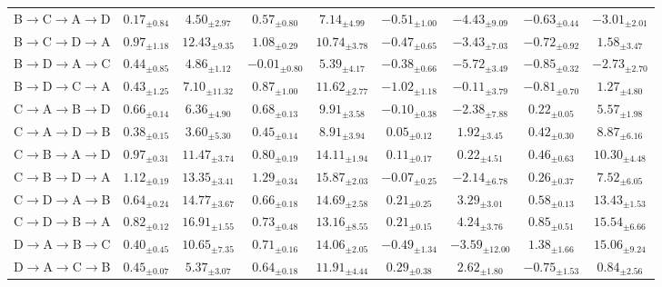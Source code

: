 \begin{table}[!t]
\begin{tabular*}{\textwidth}{@{\extracolsep{\fill}}lcccccccc}
B$\to$C$\to$A$\to$D & $0.17_{\pm0.84}$ & $4.50_{\pm2.97}$ & $0.57_{\pm0.80}$ & $7.14_{\pm4.99}$ & $-0.51_{\pm1.00}$ & $-4.43_{\pm9.09}$ & $-0.63_{\pm0.44}$ & $-3.01_{\pm2.01}$ \\
B$\to$C$\to$D$\to$A & $0.97_{\pm1.18}$ & $12.43_{\pm9.35}$ & $1.08_{\pm0.29}$ & $10.74_{\pm3.78}$ & $-0.47_{\pm0.65}$ & $-3.43_{\pm7.03}$ & $-0.72_{\pm0.92}$ & $1.58_{\pm3.47}$ \\
B$\to$D$\to$A$\to$C & $0.44_{\pm0.85}$ & $4.86_{\pm1.12}$ & $-0.01_{\pm0.80}$ & $5.39_{\pm4.17}$ & $-0.38_{\pm0.66}$ & $-5.72_{\pm3.49}$ & $-0.85_{\pm0.32}$ & $-2.73_{\pm2.70}$ \\
B$\to$D$\to$C$\to$A & $0.43_{\pm1.25}$ & $7.10_{\pm11.32}$ & $0.87_{\pm1.00}$ & $11.62_{\pm2.77}$ & $-1.02_{\pm1.18}$ & $-0.11_{\pm3.79}$ & $-0.81_{\pm0.70}$ & $1.27_{\pm4.80}$ \\
C$\to$A$\to$B$\to$D & $0.66_{\pm0.14}$ & $6.36_{\pm4.90}$ & $0.68_{\pm0.13}$ & $9.91_{\pm3.58}$ & {\boldmath$-0.10_{\pm0.38}$} & {\boldmath$-2.38_{\pm7.88}$} & $0.22_{\pm0.05}$ & $5.57_{\pm1.98}$ \\
C$\to$A$\to$D$\to$B & $0.38_{\pm0.15}$ & $3.60_{\pm5.30}$ & $0.45_{\pm0.14}$ & $8.91_{\pm3.94}$ & {\boldmath$0.05_{\pm0.12}$} & $1.92_{\pm3.45}$ & $0.42_{\pm0.30}$ & $8.87_{\pm6.16}$ \\
C$\to$B$\to$A$\to$D & $0.97_{\pm0.31}$ & $11.47_{\pm3.74}$ & $0.80_{\pm0.19}$ & $14.11_{\pm1.94}$ & $0.11_{\pm0.17}$ & {\boldmath$0.22_{\pm4.51}$} & $0.46_{\pm0.63}$ & $10.30_{\pm4.48}$ \\
C$\to$B$\to$D$\to$A & $1.12_{\pm0.19}$ & $13.35_{\pm3.41}$ & $1.29_{\pm0.34}$ & $15.87_{\pm2.03}$ & {\boldmath$-0.07_{\pm0.25}$} & {\boldmath$-2.14_{\pm6.78}$} & $0.26_{\pm0.37}$ & $7.52_{\pm6.05}$ \\
C$\to$D$\to$A$\to$B & $0.64_{\pm0.24}$ & $14.77_{\pm3.67}$ & $0.66_{\pm0.18}$ & $14.69_{\pm2.58}$ & {\boldmath$0.21_{\pm0.25}$} & {\boldmath$3.29_{\pm3.01}$} & $0.58_{\pm0.13}$ & $13.43_{\pm1.53}$ \\
C$\to$D$\to$B$\to$A & $0.82_{\pm0.12}$ & $16.91_{\pm1.55}$ & $0.73_{\pm0.48}$ & $13.16_{\pm8.55}$ & {\boldmath$0.21_{\pm0.15}$} & {\boldmath$4.24_{\pm3.76}$} & $0.85_{\pm0.51}$ & $15.54_{\pm6.66}$ \\
D$\to$A$\to$B$\to$C & $0.40_{\pm0.45}$ & $10.65_{\pm7.35}$ & $0.71_{\pm0.16}$ & $14.06_{\pm2.05}$ & $-0.49_{\pm1.34}$ & {\boldmath$-3.59_{\pm12.00}$} & $1.38_{\pm1.66}$ & $15.06_{\pm9.24}$ \\
D$\to$A$\to$C$\to$B & $0.45_{\pm0.07}$ & $5.37_{\pm3.07}$ & $0.64_{\pm0.18}$ & $11.91_{\pm4.44}$ & $0.29_{\pm0.38}$ & $2.62_{\pm1.80}$ & $-0.75_{\pm1.53}$ & $0.84_{\pm2.56}$ \\

\end{tabular*}
\end{table}
